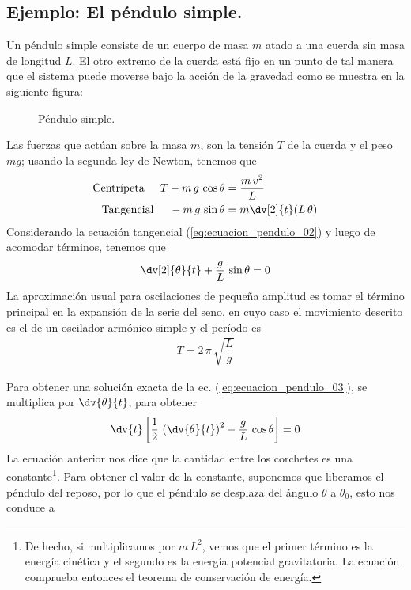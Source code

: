 \subsection{Ejemplo: El péndulo simple.}
Un péndulo simple consiste de un cuerpo de masa $m$ atado a una cuerda sin masa de longitud $L$. El otro extremo de la cuerda está fijo en un punto de tal manera que el sistema puede moverse bajo la acción de la gravedad como se muestra en la siguiente figura:
\begin{figure}[H]
    \centering
    
    \caption{Péndulo simple.}
\end{figure}
Las fuerzas que actúan sobre la masa $m$, son la tensión $T$ de la cuerda y el peso $mg$; usando la segunda ley de Newton, tenemos que
\begin{align}
\text{Centrípeta} \hspace{0.5cm} T - m \, g \, \cos \theta &= \dfrac{m \, v^{2}}{L}  \label{eq:ecuacion_pendulo_01} \\
\text{Tangencial} \hspace{0.5cm} -m \, g \, \sin \theta &= m \dv[2]{t} (L \, \theta) \label{eq:ecuacion_pendulo_02}
\end{align}
Considerando la ecuación tangencial (\ref{eq:ecuacion_pendulo_02}) y luego de acomodar términos, tenemos que
\begin{equation} \dv[2]{\theta}{t} + \dfrac{g}{L} \, \sin \theta = 0
\label{eq:ecuacion_pendulo_03}
\end{equation}
La aproximación usual para oscilaciones de pequeña amplitud es tomar el término principal en la expansión de la serie del seno, en cuyo caso el movimiento descrito es el de un oscilador armónico simple y el período es
\begin{align*}
T = 2 \, \pi \,\sqrt{\dfrac{L}{g}}
\end{align*}
\par
Para obtener una solución exacta de la ec. (\ref{eq:ecuacion_pendulo_03}), se multiplica por $\displaystyle{\dv{\theta}{t}}$, para obtener
\begin{equation}
\dv{t} \left[ \dfrac{1}{2} \, \left( \dv{\theta}{t} \right)^{2} - \dfrac{g}{L} \, \cos \theta \right] = 0
\label{eq:ecuacion_pendulo_04}
\end{equation}
La ecuación anterior nos dice que la cantidad entre los corchetes es una constante\footnote{De hecho, si multiplicamos por $m \, L^{2}$, vemos que el primer término es la energía cinética y el segundo es la energía potencial gravitatoria. La ecuación comprueba entonces el teorema de conservación de energía.}. Para obtener el valor de la constante, suponemos que liberamos el péndulo del reposo, por lo que el péndulo se desplaza del ángulo $\theta$ a $\theta_{0}$, esto nos conduce a
